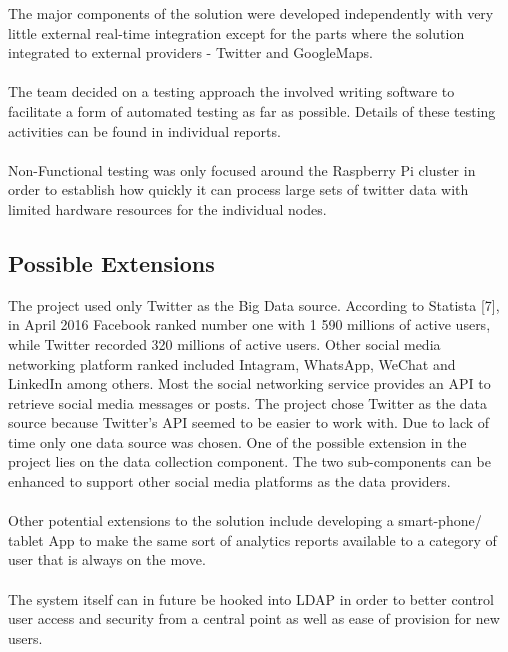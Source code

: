 \documentclass[12pt]{article} %
\begin{document}
	The major components of the solution were developed independently with very little external real-time integration except for the parts where the solution integrated to external providers - Twitter and GoogleMaps.
	\\
	\\
	The team decided on a testing approach the involved writing software to facilitate a form of automated testing as far as possible. Details of these testing activities can be found in individual reports.
	\\
	\\
	Non-Functional testing was only focused around the Raspberry Pi cluster in order to establish how quickly it can process large sets of twitter data with limited hardware resources for the individual nodes.
	
	\subsection{Possible Extensions}
	
	The project used only Twitter as the Big Data source. According to Statista [7], in April 2016 Facebook ranked number one with 1 590 millions of active users, while Twitter recorded 320 millions of active users. Other social media networking platform ranked included Intagram, WhatsApp, WeChat and LinkedIn among others. Most the social networking service provides an API to retrieve social media messages or posts. The project chose Twitter as the data source because Twitter’s API seemed to be easier to work with. Due to lack of time only one data source was chosen. One of the possible extension in the project lies on the data collection component. The two sub-components can be enhanced to support other social media platforms as the data providers.
	\\
	\\
	Other potential extensions to the solution include developing a smart-phone/ tablet App to make the same sort of analytics reports available to a category of user that is always on the move.
	\\
	\\
	The system itself can in future be hooked into LDAP in order to better control user access and security from a central point as well as ease of provision for new users.
	
	
\end{document}
